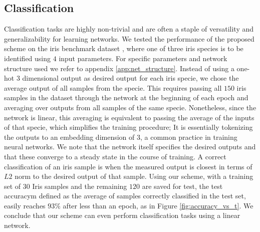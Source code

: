 \documentclass[%
 reprint,
 amsmath,amssymb,
 aps,
]{revtex4-2}
\begin{document}
{\subsection{Classification}\label{sec:Classification}

    Classification tasks are highly non-trivial and are often a staple of versatility and generalizability for learning networks. We tested the performance of the proposed scheme on the iris benchmark dataset \cite{fisher1936use}, where one of three iris species is to be identified using $4$ input parameters. For specific parameters and network structure used we refer to appendix \ref{app:net_structure}. 
    Instead of using a one-hot $3$ dimensional output as desired output for each iris specie, we chose the average output of all samples from the specie. This requires passing all $150$ iris samples in the dataset through the network at the beginning of each epoch and averaging over outputs from all samples of the same specie. Nonetheless, since the network is linear, this averaging is equivalent to passing the average of the inputs of that specie, which simplifies the training procedure; It is essentially tokenizing the outputs to an embedding dimension of $3$, a common practice in training neural networks. We note that the network itself specifies the desired outputs and that these converge to a steady state in the course of training. A correct classification of an iris sample is when the measured output is closest in terms of $L2$ norm to the desired output of that sample. Using our scheme, with a training set of $30$ Iris samples and the remaining $120$ are saved for test, the test accuracym defined as the average of samples correctly classified in the test set, easily reaches $93\%$ after less than an epoch, as in Figure \ref{fig:accuracy_vs_t}. We conclude that our scheme can even perform classification tasks using a linear network.

}
\end{document}
